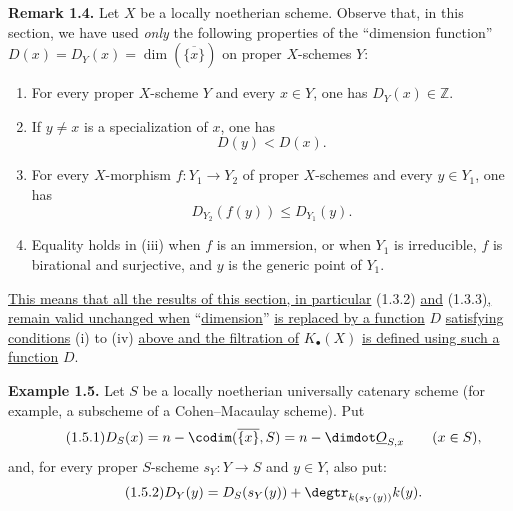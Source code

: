 \textbf{Remark 1.4.} Let $X$ be a locally noetherian scheme. Observe that, in this section, we have used \emph{only} the following properties of the ``dimension function'' $D(x)=D_Y(x)=\dim(\overline{\{x\}})$ on proper $X$-schemes $Y$:
\begin{enumerate}[label=(\roman*)]
\item For every proper $X$-scheme $Y$ and every $x\in Y$, one has $D_Y(x)\in\mathbb Z$.
\item If $y\ne x$ is a specialization of $x$, one has
\[
D(y)<D(x).
\]
\item For every $X$-morphism $f:Y_1\to Y_2$ of proper $X$-schemes and every $y\in Y_1$, one has
\[
D_{Y_2}(f(y))\leq D_{Y_1}(y).
\]
\item Equality holds in (iii) when $f$ is an immersion, or when $Y_1$ is irreducible, $f$ is birational and surjective, and $y$ is the generic point of $Y_1$.
\end{enumerate}

\uline{This means that all the results of this section, in particular} (1.3.2) \uline{and} (1.3.3)\uline{, remain valid unchanged when} ``\uline{dimension}'' \uline{is replaced by a function} $D$ \uline{satisfying conditions} (i) to (iv) \uline{above and the filtration of} $K_\bullet(X)$ \uline{is defined using such a function} $D$.


%

\textbf{Example 1.5.} Let $S$ be a locally noetherian universally catenary scheme (for example, a subscheme of a Cohen--Macaulay scheme). Put
\begin{equation}\tag{1.5.1}
D_S(x)=n-\codim(\overline{\{x\}},S)=n-\dimdot\underline{O}_{S,x}\qquad(x\in S),
\end{equation}
and, for every proper $S$-scheme $s_Y:Y\to S$ and $y\in Y$, also put:
\begin{equation}\tag{1.5.2}
D_Y(y)=D_S(s_Y(y))+\degtr_{k(s_Y(y))}k(y).
\end{equation}

